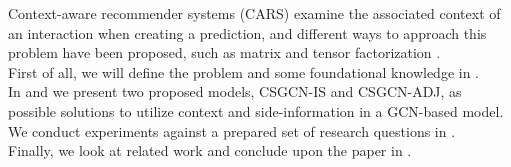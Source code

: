Context-aware recommender systems (CARS) examine the associated context of an interaction when creating a prediction, and different ways to approach this problem have been proposed, such as matrix and tensor factorization \cite{carsprogress, CAMF}.\\
First of all, we will define the problem and some foundational knowledge in .\\
In  and  we present two proposed models, CSGCN-IS and CSGCN-ADJ, as possible solutions to utilize context and side-information in a GCN-based model.
We conduct experiments against a prepared set of research questions in .\\
Finally, we look at related work and conclude upon the paper in .
\\\\
